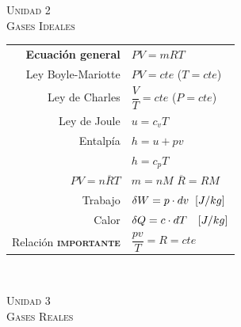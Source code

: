 \documentclass[11pt,a4paper,twocolumn]{article}
\newcommand{\unidad}[2]{\begin{center}
		\fontsize{10}{10}\selectfont\color{gray!50!black}\scshape Unidad #1 \\
		\fontsize{14}{14}\selectfont \scshape #2
	\end{center} \vspace{-.5cm}}
\begin{document}
	\unidad{2}{Gases Ideales}
	\begin{tcolorbox}[colback=white!97!brown, colframe=brown!15!gray]
		
		\begin{tabular}{r l}
		\vspace{.1cm}	\textbf{Ecuación general} & $PV=mRT$ \\
		
		
		\vspace{.1cm}	Ley Boyle-Mariotte 	& $PV=cte$  ($T=cte$)\\
		\vspace{.1cm}	Ley de Charles			& $\dfrac{V}{T}=cte$  ($P=cte$)\\
		
		\vspace{.1cm}	Ley de Joule& $u= c_{v} T$ \\
		\vspace{.1cm}	Entalpía 	& $h=u+pv$ \\
		\vspace{.1cm}			 	& $h=c_{p}T$ \\
		
		\vspace{.1cm}	$PV = n \overline{R} T$ & $m=nM$ \hspace{.2cm} $\overline{R} = R M$\\
		\vspace{.1cm}	 Trabajo			 & $\delta W= p \cdot dv  \hspace{.2cm} [J/kg] $ \\
		\vspace{.1cm}	 Calor 					& $\delta Q=c \cdot dT \hspace{.35cm} [J/kg] $  \\
	
	\vspace{.2cm}		Relación \textbf{\textsc{importante}} &  $\dfrac{pv}{T}=R=cte$ \\	
		\end{tabular}\\


	\end{tcolorbox}

\newpage



		\unidad{3}{Gases Reales}
	
\end{document}
